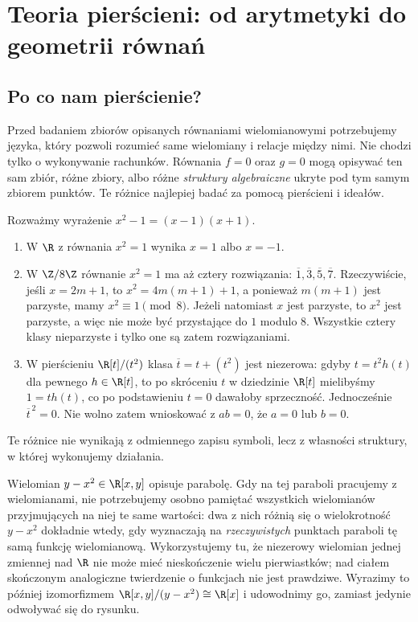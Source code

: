 \chapter{Teoria pierścieni: od arytmetyki do geometrii równań}
\label{ch:pierscienie}

\providecommand{\atlasref}[2]{#2}

\section{Po co nam pierścienie?}

Przed badaniem zbiorów opisanych równaniami wielomianowymi potrzebujemy języka,
który pozwoli rozumieć same wielomiany i relacje między nimi. Nie chodzi tylko
 o wykonywanie rachunków. Równania $f=0$ oraz $g=0$ mogą opisywać ten sam zbiór,
różne zbiory, albo różne \emph{struktury algebraiczne} ukryte pod tym samym
zbiorem punktów. Te różnice najlepiej badać za pomocą pierścieni i ideałów.

\begin{przyklad}
Rozważmy wyrażenie $x^2-1=(x-1)(x+1)$.
\begin{enumerate}[label=\arabic*)]
\item W $\R$ z równania $x^2=1$ wynika $x=1$ albo $x=-1$.
\item W $\Z/8\Z$ równanie $x^2=1$ ma aż cztery rozwiązania:
$\overline1,\overline3,\overline5,\overline7$.
Rzeczywiście, jeśli $x=2m+1$, to $x^2=4m(m+1)+1$, a ponieważ $m(m+1)$
jest parzyste, mamy $x^2\equiv1\pmod8$.
Jeżeli natomiast $x$ jest parzyste, to $x^2$ jest parzyste,
a więc nie może być przystające do $1$ modulo $8$.
Wszystkie cztery klasy nieparzyste i tylko one są zatem rozwiązaniami.
\item W pierścieniu $\R[t]/(t^2)$ klasa $\overline t=t+(t^2)$
jest niezerowa: gdyby $t=t^2h(t)$ dla pewnego $h\in\R[t]$,
to po skróceniu $t$ w dziedzinie $\R[t]$ mielibyśmy
$1=th(t)$, co po podstawieniu $t=0$ dawałoby sprzeczność.
Jednocześnie $\overline t^{\,2}=0$. Nie wolno zatem wnioskować
z $ab=0$, że $a=0$ lub $b=0$.
\end{enumerate}
Te różnice nie wynikają z odmiennego zapisu symboli, lecz z własności
struktury, w której wykonujemy działania.
\end{przyklad}

\begin{przyklad}
Wielomian $y-x^2\in\R[x,y]$ opisuje parabolę. Gdy na tej paraboli
pracujemy z wielomianami, nie potrzebujemy osobno pamiętać wszystkich
wielomianów przyjmujących na niej te same wartości: dwa z nich różnią się
o wielokrotność $y-x^2$ dokładnie wtedy, gdy wyznaczają na \emph{rzeczywistych}
punktach paraboli tę samą funkcję wielomianową. Wykorzystujemy tu, że
niezerowy wielomian jednej zmiennej nad $\R$ nie może mieć nieskończenie
wielu pierwiastków; nad ciałem skończonym analogiczne twierdzenie o funkcjach
nie jest prawdziwe. Wyrazimy to później izomorfizmem
$\R[x,y]/(y-x^2)\cong\R[x]$ i udowodnimy go, zamiast jedynie odwoływać się
do rysunku.
\end{przyklad}

